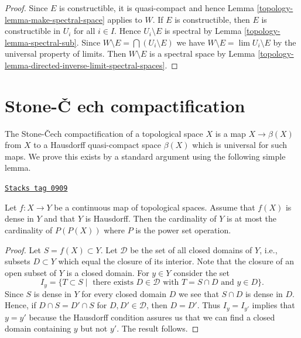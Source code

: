 \begin{proof}

Since $E$ is constructible, it is quasi-compact and hence
Lemma \ref{topology-lemma-make-spectral-space} applies to $W$.
If $E$ is constructible, then $E$ is constructible in $U_i$
for all $i \in I$. Hence $U_i \setminus E$
is spectral by Lemma \ref{topology-lemma-spectral-sub}.
Since $W \setminus E = \bigcap (U_i \setminus E)$ we have
$W \setminus E = \lim U_i \setminus E$ by the universal property of limits.
Then $W \setminus E$ is a spectral space by
Lemma \ref{topology-lemma-directed-inverse-limit-spectral-spaces}.
\end{proof}

\section{Stone-{\v C}
ech compactification}
\label{topology-section-stone-cech}

The Stone-{\v C}ech compactification of a topological space $X$
is a map $X \to \beta(X)$ from $X$ to a Hausdorff quasi-compact space
$\beta(X)$ which is universal for such maps. We prove this exists
by a standard argument using the following simple lemma.

\begin{lemma}
\label{topology-lemma-dense-image}
\href{https://stacks.math.columbia.edu/tag/0909}{\texttt{Stacks tag 0909}}

Let $f : X \to Y$ be a continuous map of topological spaces. Assume that
$f(X)$ is dense in $Y$ and that $Y$ is Hausdorff. Then the cardinality
of $Y$ is at most the cardinality of $P(P(X))$ where $P$ is the power
set operation.
\end{lemma}

\begin{proof}
Let $S = f(X) \subset Y$. Let $\mathcal{D}$ be the set of all
closed domains of $Y$, i.e., subsets $D \subset Y$ which
equal the closure of its interior. Note that the closure of an
open subset of $Y$ is a closed domain. For $y \in Y$ consider the set
$$
I_y = \{T \subset S \mid \text{ there exists }
D \in \mathcal{D}\text{ with }T = S \cap D\text{ and }y \in D\}.
$$
Since $S$ is dense in $Y$ for every closed domain $D$ we see
that $S \cap D$ is dense in $D$. Hence, if
$D \cap S = D' \cap S$ for $D, D' \in \mathcal{D}$, then
$D = D'$. Thus $I_y = I_{y'}$ implies that $y = y'$ because the
Hausdorff condition assures us that we can find a closed domain
containing $y$ but not $y'$. The result follows.
\end{proof}

